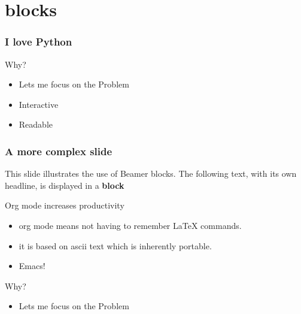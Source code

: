 \documentclass[bigger, presentation]{beamer}
\begin{document}
\section{blocks}
\label{sec-5}
\begin{frame}
\frametitle{I love Python}
\label{sec-5-1}
\begin{block}{Why?}
\label{sec-5-1-1}

\begin{itemize}
\item Lets me focus on the Problem
\item Interactive
\item Readable
\end{itemize}
\end{block}
\end{frame}
\begin{frame}
\frametitle{A more complex slide}
\label{sec-5-2}

   This slide illustrates the use of Beamer blocks.  The following text,
   with its own headline, is displayed in a \textbf{block}
\begin{block}{Org mode increases productivity}
\label{sec-5-2-1}

\begin{itemize}
\item org mode means not having to remember \LaTeX{} commands.
\item it is based on ascii text which is inherently portable.
\item Emacs!
\end{itemize}
\end{block}
\begin{block}{Why?}
\label{sec-5-2-2}

\begin{itemize}
\item Lets me focus on the Problem
\end{itemize}
\end{block}
\end{frame}
\end{document}
